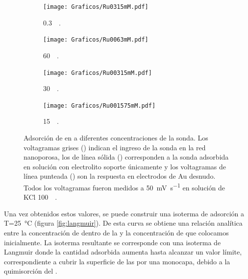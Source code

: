 \begin{figure}[b!]
\begin{subfigure}[t]{0.325\textwidth}
			     		\end{subfigure}
		     		\begin{subfigure}[t]{0.325\textwidth}
			        	\texttt{[image: Graficos/Ru0315mM.pdf]}
			       		\vspace*{-0.40cm}\caption{\aminorutenio\space \SI{0.3}{\milli\Molar}.}
			         	\label{fig:Ru0315mM}
			     		\end{subfigure}
			     	 \begin{subfigure}[t]{0.325\textwidth}
			        	\texttt{[image: Graficos/Ru0063mM.pdf]}
			       		\vspace*{-0.40cm}\caption{\aminorutenio\space \SI{60}{\micro\Molar}.}
			         	\label{fig:Ru0063mM}
			     		\end{subfigure}
		     		\begin{subfigure}[t]{0.325\textwidth}
			        	\texttt{[image: Graficos/Ru00315mM.pdf]}
			       		\vspace*{-0.40cm}\caption{\aminorutenio\space \SI{30}{\micro\Molar}.}
			         	\label{fig:Ru00315mM}
			     		\end{subfigure}
		     		\begin{subfigure}[t]{0.325\textwidth}
			        	\texttt{[image: Graficos/Ru001575mM.pdf]}
			       		\vspace*{-0.40cm}\caption{\aminorutenio\space \SI{15}{\micro\Molar}.}
			         	\label{fig:Ru001575mM}
			     		\end{subfigure}	
		 	   	   	\caption[Preconcentración de \aminorutenio\space en \pdmF]{Adsorción de \ru\space en \pdm\space a diferentes concentraciones de la sonda. Los voltagramas grises (\usebox{\gris}) indican el ingreso de la sonda en la red nanoporosa, los de línea sólida (\usebox{\negro}) corresponden a la sonda adsorbida en solución con electrolito soporte únicamente y los voltagramas de línea punteada (\usebox{\punteado}) son la respuesta en electrodos de Au  desnudo. Todos los voltagramas fueron medidos a \SI{50}{\milli\volt\per\second} en solución de KCl \SI{100}{\milli\Molar}.}
		     		\label{fig:preconcentraciones}
		     	   	\end{figure} 	
		Una vez obtenidos estos valores, se puede construir una isoterma de adsorción a T=\SI{25}{\celsius} (figura \ref{fig:langmuir}). De esta curva se obtiene una relación analítica entre la concentración de \ru\space dentro de la \pdm\space y la concentración de \ru\space que colocamos inicialmente. La isoterma resultante se corresponde con una isoterma de Langmuir donde la cantidad adsorbida aumenta hasta alcanzar un valor límite, correspondiente a cubrir la superficie de las \pdm\space por una monocapa, debido a la quimisorción del \ru.\cite{langmuir1918}

